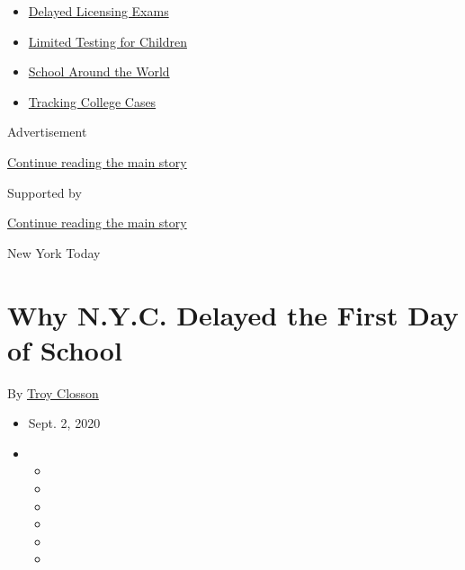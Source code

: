 \begin{itemize}
\tightlist
\item
  \href{https://www.nytimes3xbfgragh.onion/2020/09/04/us/bar-exam-coronavirus.html?name=styln-coronavirus-schools-reopening\&region=TOP_BANNER\&block=storyline_menu_recirc\&action=click\&pgtype=Article\&impression_id=530463f1-f27a-11ea-adaf-9558d58a001f\&variant=undefined}{Delayed
  Licensing Exams}
\item
  \href{https://www.nytimes3xbfgragh.onion/2020/09/08/upshot/children-testing-shortfalls-virus.html?name=styln-coronavirus-schools-reopening\&region=TOP_BANNER\&block=storyline_menu_recirc\&action=click\&pgtype=Article\&impression_id=530463f2-f27a-11ea-adaf-9558d58a001f\&variant=undefined}{Limited
  Testing for Children}
\item
  \href{https://www.nytimes3xbfgragh.onion/2020/09/01/world/schools-reopen-globe-students.html?name=styln-coronavirus-schools-reopening\&region=TOP_BANNER\&block=storyline_menu_recirc\&action=click\&pgtype=Article\&impression_id=53048b00-f27a-11ea-adaf-9558d58a001f\&variant=undefined}{School
  Around the World}
\item
  \href{https://www.nytimes3xbfgragh.onion/interactive/2020/us/covid-college-cases-tracker.html?name=styln-coronavirus-schools-reopening\&region=TOP_BANNER\&block=storyline_menu_recirc\&action=click\&pgtype=Article\&impression_id=53048b01-f27a-11ea-adaf-9558d58a001f\&variant=undefined}{Tracking
  College Cases}
\end{itemize}

Advertisement

\protect\hyperlink{after-top}{Continue reading the main story}

Supported by

\protect\hyperlink{after-sponsor}{Continue reading the main story}

New York Today

\hypertarget{why-nyc-delayed-the-first-day-of-school}{%
\section{Why N.Y.C. Delayed the First Day of
School}\label{why-nyc-delayed-the-first-day-of-school}}

By \href{https://www.nytimes3xbfgragh.onion/by/troy-closson}{Troy
Closson}

\begin{itemize}
\item
  Sept. 2, 2020
\item
  \begin{itemize}
  \item
  \item
  \item
  \item
  \item
  \item
  \end{itemize}
\end{itemize}


